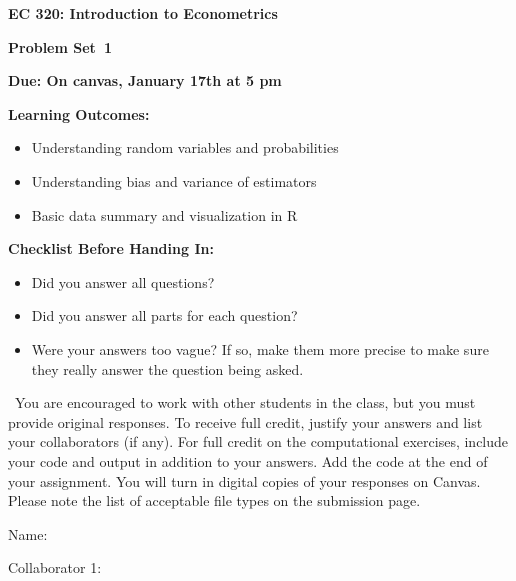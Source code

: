 \documentclass[11pt]{article}
\begin{document}
\begin{onehalfspacing}

\begin{center}
\textbf{EC 320: Introduction to Econometrics} \bigskip

\textbf{Problem Set\bigskip\ 1}
\bigskip
\end{center}



\noindent \textbf{Due: On canvas, January 17th at 5 pm}

\bigskip

\noindent \textbf{Learning Outcomes:}
\begin{itemize}
\item Understanding random variables and probabilities  
\item Understanding bias and variance of estimators 
\item Basic data summary and visualization in R
\end{itemize}

\bigskip


\noindent \textbf{Checklist Before Handing In:}
\begin{itemize}
\item Did you answer all questions?
\item Did you answer all parts for each question?
\item Were your answers too vague? If so, make them more precise to make sure they really answer the question being asked.
\end{itemize}

\bigskip

\ You are encouraged to work with other students in the class, but you must provide original responses. To receive full credit, justify your answers and list your collaborators (if any). For full credit on the computational exercises, include your code and output in addition to your answers. Add the code at the end of your assignment. You will turn in digital copies of your responses on Canvas. Please note the list of acceptable file types on the submission page.  \\
\vspace{0.1in}

Name: 			\\
\vspace{0.1in}

Collaborator 1: \\

\vspace{0.1in}


\end{onehalfspacing}
\end{document}
